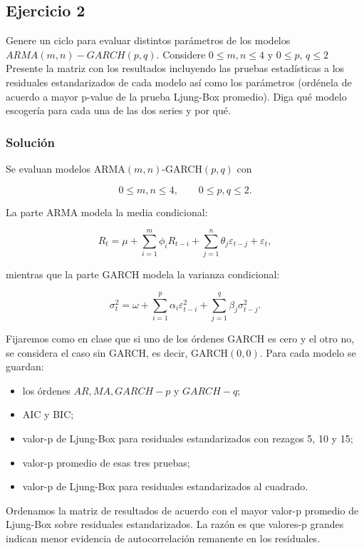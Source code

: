 \documentclass[
]{article}
\providecommand{\tightlist}{%
  \setlength{\itemsep}{0pt}\setlength{\parskip}{0pt}}
\begin{document}
\subsection{Ejercicio 2}\label{ejercicio-2}

Genere un ciclo para evaluar distintos parámetros de los modelos
\(ARMA(m,n)- GARCH(p,q)\). Considere \(0 ≤ m, n ≤ 4\) y \(0 ≤ p\),
\(q ≤ 2\) Presente la matriz con los resultados incluyendo las pruebas
estadísticas a los residuales estandarizados de cada modelo así como los
parámetros (ordénela de acuerdo a mayor p-value de la prueba Ljung-Box
promedio). Diga qué modelo escogería para cada una de las dos series y
por qué.

\subsubsection{Solución}\label{soluciuxf3n-1}

Se evaluan modelos ARMA\((m,n)\)-GARCH\((p,q)\) con

\[
  0 \leq m,n \leq 4, \qquad 0 \leq p,q \leq 2.
\]

La parte ARMA modela la media condicional:

\[
  R_t = \mu + \sum_{i=1}^{m}\phi_i R_{t-i} + \sum_{j=1}^{n}\theta_j\varepsilon_{t-j} + \varepsilon_t,
\]

mientras que la parte GARCH modela la varianza condicional:

\[
  \sigma_t^2 = \omega + \sum_{i=1}^{p}\alpha_i\varepsilon_{t-i}^2 + \sum_{j=1}^{q}\beta_j\sigma_{t-j}^2.
\]

Fijaremos como en clase que si uno de los órdenes GARCH es cero y el
otro no, se considera el caso sin GARCH, es decir, GARCH\((0,0)\). Para
cada modelo se guardan:

\begin{itemize}
\tightlist
\item
  los órdenes \(AR, MA, GARCH-p\) y \(GARCH-q\);
\item
  AIC y BIC;
\item
  valor-p de Ljung-Box para residuales estandarizados con rezagos 5, 10
  y 15;
\item
  valor-p promedio de esas tres pruebas;
\item
  valor-p de Ljung-Box para residuales estandarizados al cuadrado.
\end{itemize}

Ordenamos la matriz de resultados de acuerdo con el mayor valor-p
promedio de Ljung-Box sobre residuales estandarizados. La razón es que
valores-p grandes indican menor evidencia de autocorrelación remanente
en los residuales.
\end{document}
